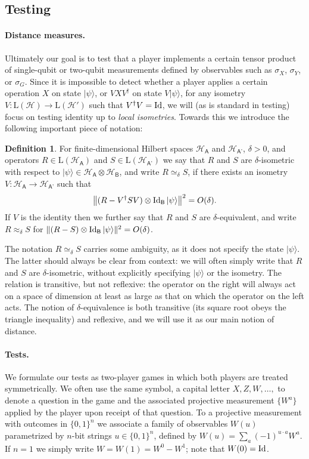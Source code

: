\documentclass[11pt]{article}
\theoremstyle{remark}
\theoremstyle{definition}
\newtheorem{definition}[theorem]{Definition}
\newcommand{\ket}[1]{|#1\rangle}
\newcommand{\Id}{\ensuremath{\mathop{\rm Id}\nolimits}}
\newcommand{\reg}[1]{{\textsf{#1}}}
\newcommand{\mH}{\mathcal{H}}
\newcommand{\setft}[1]{\mathrm{#1}}
\newcommand{\Lin}{\setft{L}}
\begin{document}
\subsection{Testing}
\label{sec:general-rigidity}

\paragraph{Distance measures.}
Ultimately our goal is to test that a player implements a certain tensor product of single-qubit or two-qubit measurements defined by observables such as $\sigma_X$, $\sigma_Y$, or $\sigma_G$. Since it is impossible to detect whether a player applies a certain operation $X$ on state $\ket{\psi}$, or $VXV^\dagger$ on state $V\ket{\psi}$, for any isometry $V:\Lin(\mH)\to\Lin(\mH')$ such that $V^\dagger V = \Id$, we will (as is standard in testing) focus on testing identity up to \emph{local isometries}. Towards this we introduce the following important piece of notation: 

\begin{definition}
For finite-dimensional Hilbert spaces $\mH_{\reg{A}}$ and $\mH_{\reg{A'}}$, $\delta>0$, and operators $R \in\Lin(\mH_{\reg{A}})$ and $S\in\Lin(\mH_{\reg{A'}})$ we say that $R$ and $S$ are $\delta$-isometric with respect to $\ket{\psi} \in \mH_{\reg{A}} \otimes \mH_{\reg{B}}$, and write $R\simeq_\delta S$, if there exists an isometry $V:\mH_{\reg{A}}\to\mH_{\reg{A'}}$ such that 
$$\big\|( R-V^\dagger SV)\otimes \Id_{\reg{B}} \ket{\psi}\big\|^2=O(\delta).$$
If $V$ is the identity then we further say that $R$ and $S$ are $\delta$-equivalent, and write $R\approx_\delta S$ for $\| ( R- S) \otimes \Id_{\reg{B}} \ket{\psi}\|^2=O(\delta)$.
\end{definition}

The notation $R\simeq_\delta S$ carries some ambiguity, as it does not specify the state $\ket{\psi}$. The latter should always be clear from context: we will often simply write that $R$ and $S$ are $\delta$-isometric, without explicitly specifying $\ket{\psi}$ or the isometry. The relation is transitive, but not reflexive: the operator on the right will always act on a space of dimension at least as large as that on which the operator on the left acts. The notion of $\delta$-equivalence is both transitive (its square root obeys the triangle inequality) and reflexive, and we will use it as our main notion of distance. 

\paragraph{Tests.}
We formulate our tests as two-player games in which both players are treated symmetrically.  We often use the same symbol, a capital letter $X,Z,W,\ldots,$ to denote a question in the game and the associated projective measurement $\{W^a\}$ applied by the player upon receipt of that question. To a projective measurement with outcomes in $\{0,1\}^n$ we  associate a family of observables $W(u)$ parametrized by $n$-bit strings $u\in\{0,1\}^n$, defined by $W(u) = \sum_a (-1)^{u\cdot a} W^a$. If $n=1$ we simply write $W=W(1)=W^0-W^1$; note that $W(0)=\Id$.
\end{document}
